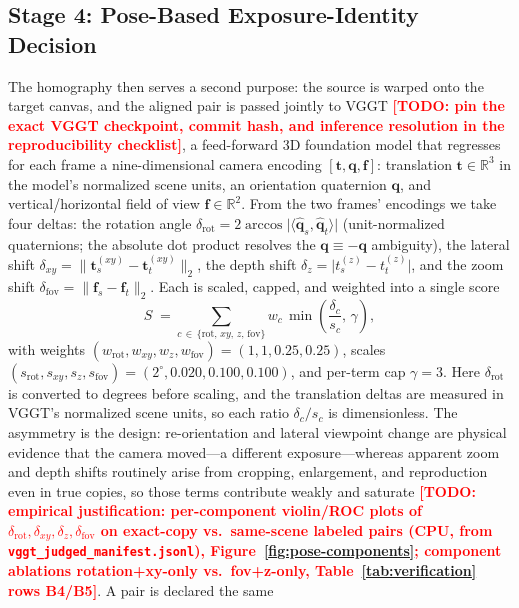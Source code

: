 \documentclass[letterpaper]{article} %
\newcommand{\todo}[1]{\textcolor{red}{\textbf{[TODO: #1]}}}
\begin{document}
\subsection{Stage 4: Pose-Based Exposure-Identity Decision}

The homography then serves a second purpose: the source is warped onto the
target canvas, and the aligned pair is passed jointly to VGGT
\citep{wang2025vggt} \todo{pin the exact VGGT checkpoint, commit hash, and
inference resolution in the reproducibility checklist}, a feed-forward 3D
foundation model that regresses for each frame a nine-dimensional camera
encoding $[\mathbf{t}, \mathbf{q}, \mathbf{f}]$: translation
$\mathbf{t}\in\mathbb{R}^3$ in the model's normalized scene units, an
orientation quaternion $\mathbf{q}$, and vertical/horizontal field of view
$\mathbf{f}\in\mathbb{R}^2$. From the two frames' encodings we take four
deltas: the rotation angle
$\delta_{\mathrm{rot}} = 2\arccos\lvert\langle\hat{\mathbf{q}}_s,
\hat{\mathbf{q}}_t\rangle\rvert$ (unit-normalized quaternions; the absolute
dot product resolves the $\mathbf{q}\equiv-\mathbf{q}$ ambiguity), the
lateral shift $\delta_{xy} = \lVert\mathbf{t}^{(xy)}_s -
\mathbf{t}^{(xy)}_t\rVert_2$, the depth shift $\delta_{z} = \lvert t^{(z)}_s
- t^{(z)}_t\rvert$, and the zoom shift $\delta_{\mathrm{fov}} =
\lVert\mathbf{f}_s - \mathbf{f}_t\rVert_2$. Each is scaled, capped, and
weighted into a single score
\begin{equation}
S \;=\!\! \sum_{c\,\in\,\{\mathrm{rot},\,xy,\,z,\,\mathrm{fov}\}}\!\!
w_c \,\min\!\left(\frac{\delta_c}{s_c},\, \gamma\right),
\label{eq:pose-score}
\end{equation}
with weights $(w_{\mathrm{rot}}, w_{xy}, w_{z}, w_{\mathrm{fov}}) =
(1, 1, 0.25, 0.25)$, scales $(s_{\mathrm{rot}}, s_{xy}, s_{z},
s_{\mathrm{fov}}) = (2^{\circ}, 0.020, 0.100, 0.100)$, and per-term cap
$\gamma = 3$. Here $\delta_{\mathrm{rot}}$ is converted to degrees before
scaling, and the translation deltas are measured in VGGT's normalized scene
units, so each ratio $\delta_c / s_c$ is dimensionless. The asymmetry is the
design: re-orientation and lateral
viewpoint change are physical evidence that the camera moved---a different
exposure---whereas apparent zoom and depth shifts routinely arise from
cropping, enlargement, and reproduction even in true copies, so those terms
contribute weakly and saturate \todo{empirical justification: per-component
violin/ROC plots of $\delta_{\mathrm{rot}}, \delta_{xy}, \delta_{z},
\delta_{\mathrm{fov}}$ on exact-copy vs.\ same-scene labeled pairs (CPU,
from \texttt{vggt\_judged\_manifest.jsonl}), Figure~\ref{fig:pose-components};
component ablations rotation+xy-only vs.\ fov+z-only,
Table~\ref{tab:verification} rows B4/B5}. A pair is declared the same
\end{document}
